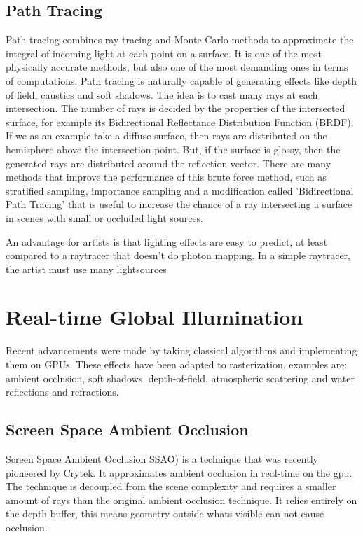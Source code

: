 	\subsection {Path Tracing}
		Path tracing combines ray tracing and Monte Carlo methods to approximate the
		integral of incoming light at each point on a surface. It is one of the most physically
		accurate methods, but also one of the most demanding ones in terms of
		computations. Path tracing is naturally capable of generating effects like depth
		of field, caustics and soft shadows. The idea is to cast many rays at each
		intersection. The number of rays is decided by the properties of the intersected
		surface, for example its Bidirectional Reflectance Distribution Function (BRDF). 
		If we as an example take a diffuse surface, then rays are distributed on the hemisphere 
		above the intersection point. But, if the surface is glossy, then the generated 
		rays are distributed around the reflection vector. 
		There are many methods that improve the performance of this brute force
		method, such as stratified sampling, importance sampling and a modification
		called 'Bidirectional Path Tracing' that is useful to increase the chance of a
		ray intersecting a surface in scenes with small or occluded light sources.
		
		An advantage for artists is that lighting effects are easy to predict, at least compared to a raytracer that doesn't do photon mapping. In a simple raytracer, the artist must use many lightsources 

	\section {Real-time Global Illumination}  
		Recent advancements were made by taking classical algorithms and implementing them on GPUs. 
		These effects have been adapted to rasterization, examples are: ambient occlusion, soft shadows,
		depth-of-field, atmospheric scattering and water reflections and refractions.

    \subsection {Screen Space Ambient Occlusion}  
		Screen Space Ambient Occlusion SSAO) is a technique that was recently pioneered
		by Crytek. It approximates ambient occlusion in real-time on the gpu. The
		technique is decoupled from the scene complexity and requires a smaller amount
		of rays than the original ambient occlusion technique. It relies entirely on the
		depth buffer, this means geometry outside whats visible can not cause occlusion.

